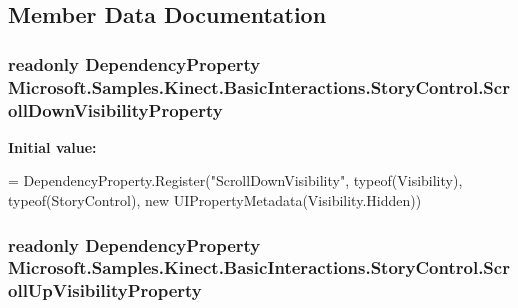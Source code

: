 \subsection{Member Data Documentation}
\hypertarget{class_microsoft_1_1_samples_1_1_kinect_1_1_basic_interactions_1_1_story_control_a9f10c86aac1f2bb805f3fedc09040c75}{
\subsubsection[{Scroll\-Down\-Visibility\-Property}]{\setlength{\rightskip}{0pt plus 5cm}readonly Dependency\-Property Microsoft.\-Samples.\-Kinect.\-Basic\-Interactions.\-Story\-Control.\-Scroll\-Down\-Visibility\-Property\hspace{0.3cm}{\ttfamily [static]}}}\label{class_microsoft_1_1_samples_1_1_kinect_1_1_basic_interactions_1_1_story_control_a9f10c86aac1f2bb805f3fedc09040c75}
{\bfseries Initial value\-:}
\begin{DoxyCode}
=
            DependencyProperty.Register(\textcolor{stringliteral}{"ScrollDownVisibility"}, typeof(Visibility), typeof(StoryControl), \textcolor{keyword}{
      new} UIPropertyMetadata(Visibility.Hidden))
\end{DoxyCode}
\hypertarget{class_microsoft_1_1_samples_1_1_kinect_1_1_basic_interactions_1_1_story_control_ab1dca78da9137425a11c52ad2baf0e7f}{
\subsubsection[{Scroll\-Up\-Visibility\-Property}]{\setlength{\rightskip}{0pt plus 5cm}readonly Dependency\-Property Microsoft.\-Samples.\-Kinect.\-Basic\-Interactions.\-Story\-Control.\-Scroll\-Up\-Visibility\-Property\hspace{0.3cm}{\ttfamily [static]}}}\label{class_microsoft_1_1_samples_1_1_kinect_1_1_basic_interactions_1_1_story_control_ab1dca78da9137425a11c52ad2baf0e7f}
